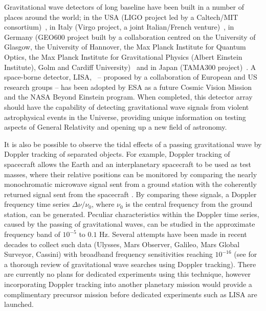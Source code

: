\documentclass{article}
\begin{document}
Gravitational wave detectors of long baseline have been built in a number of
places around the world; in the USA (LIGO project led by a Caltech/MIT
consortium)~\cite{LIGOS5, LIGOweb}, in Italy (Virgo project, a joint
Italian/French venture)~\cite{Acernese:2007, Virgoweb}, in Germany (GEO600
project built by a collaboration centred on the University of Glasgow, the
University of Hannover, the Max Planck Institute for Quantum Optics, the Max
Planck Institute for Gravitational Physics (Albert Einstein Institute), Golm and
Cardiff University)~\cite{Willke:2007, GEOweb} and in Japan (TAMA300
project)~\cite{TAMAStatus, TAMAweb}. A space-borne detector, LISA,~\cite{LISA,
NASAweb, ESAweb} -- proposed by a collaboration of European and US research
groups -- has been adopted by ESA as a future Cosmic Vision Mission and the NASA
Beyond Einstein program. When completed, this detector array should have the
capability of detecting gravitational wave signals from violent astrophysical
events in the Universe, providing unique information on testing aspects of
General Relativity and opening up a new field of astronomy.

It is also be possible to observe the tidal effects of a passing gravitational
wave by Doppler tracking of separated objects.  For example, Doppler tracking of
spacecraft allows the Earth and an interplanetary spacecraft to be used as test
masses, where their relative positions can be monitored by comparing the nearly
monochromatic microwave signal sent from a ground station with the coherently
returned signal sent from the spacecraft \cite{Estabrook:1975}.  By comparing
these signals, a Doppler frequency time series $\Delta \nu / \nu_0$, where
$\nu_0$ is the central frequency from the ground station, can be generated.
Peculiar characteristics within the Doppler time series, caused by the passing
of gravitational waves, can be studied in the approximate frequency band of
$10^{-5}$ to $0.1$ Hz. Several attempts have been made in recent decades to
collect such data (Ulysses, Mars Observer, Galileo, Mars Global Surveyor,
Cassini) with broadband frequency sensitivities reaching $10^{-16}$ (see
\cite{Armstrong:2006} for a thorough review of gravitational wave searches using
Doppler tracking). There are currently no plans for dedicated experiments using
this technique, however incorporating Doppler tracking into another planetary
mission would provide a complimentary precursor mission before dedicated
experiments such as LISA are launched.
\end{document}
